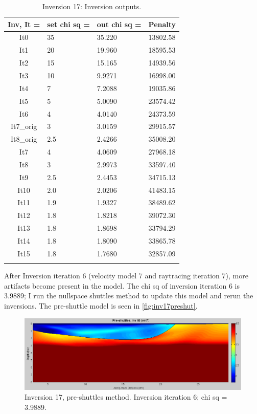 \documentclass[fontsize=11pt, %
                             paper=a4, %
                             twoside, %
                             captions=tableheading,
                             index=totoc,
                             hyperref]{labbook}
\begin{document}
\begin{addmargin}[4cm]{0cm}
\begin{table}[!ht]
\label{tab:i17}
\raggedleft
\begin{tabular}{c l l l}
\toprule
\textbf{Inv, It = } & \textbf{set chi sq =} & \textbf{out chi sq =} & \textbf{Penalty} \\
\toprule
It0 & 35 &  35.220 & 13802.58\\
It1 & 20 & 19.960 & 18595.53\\
It2 & 15 & 15.165 & 14939.56\\
It3 & 10 & 9.9271 & 16998.00\\
It4 & 7 & 7.2088 & 19035.86\\
It5 & 5 & 5.0090 & 23574.42\\
It6 & 4 & 4.0140 & 24373.59\\
It7\_orig & 3 & 3.0159 & 29915.57\\
It8\_orig & 2.5 & 2.4266 & 35008.20\\
It7 & 4 & 4.0609 & 27968.18\\
It8 & 3 & 2.9973 & 33597.40\\
It9 & 2.5 & 2.4453 & 34715.13\\
It10 & 2.0 & 2.0206 & 41483.15\\
It11 & 1.9 & 1.9327 & 38489.62\\
It12 & 1.8 & 1.8218 & 39072.30\\
It13 & 1.8 & 1.8698 & 33794.29\\
It14 & 1.8 & 1.8090 & 33865.78\\
It15 & 1.8 & 1.7680 & 32857.09\\
\bottomrule\\
\end{tabular}
\caption{Inversion 17: Inversion outputs.}
\end{table}

\clearpage{}

After Inversion iteration 6 (velocity model 7 and raytracing iteration 7), more artifacts become present in the model.  The chi sq of inversion iteration 6 is 3.9889; I run the nullspace shuttles method to update this model and rerun the inversions.  The pre-shuttle model is seen in \autoref{fig:inv17preshut}.

\begin{figure}[h!]
\raggedleft
\includegraphics[scale=0.4,keepaspectratio=true]{figs/inv17preshut.png}
\caption{Inversion 17, pre-shuttles method.  Inversion iteration 6; chi sq = 3.9889.}
\label{fig:inv17preshut}
\end{figure}


\end{addmargin}
\end{document}
